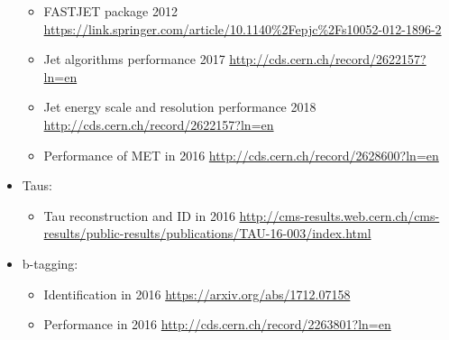 \begin{itemize}
\begin{itemize}
        \item FASTJET package 2012
        \url{https://link.springer.com/article/10.1140\%2Fepjc\%2Fs10052-012-1896-2}
        \item Jet algorithms performance 2017
        \url{http://cds.cern.ch/record/2622157?ln=en}
        \item Jet energy scale and resolution performance 2018
        \url{http://cds.cern.ch/record/2622157?ln=en}
        \item Performance of MET in 2016
        \url{http://cds.cern.ch/record/2628600?ln=en}
    \end{itemize}
    \item Taus:
    \begin{itemize}
        \item Tau reconstruction and ID in 2016
        \url{http://cms-results.web.cern.ch/cms-results/public-results/publications/TAU-16-003/index.html}
    \end{itemize}
    \item b-tagging:
    \begin{itemize}
        \item Identification in 2016 \url{https://arxiv.org/abs/1712.07158}
        \item Performance in 2016 \url{http://cds.cern.ch/record/2263801?ln=en}
    \end{itemize}
\end{itemize}
